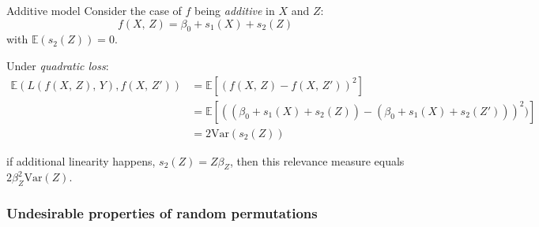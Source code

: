 \begin{example}{Additive model}{}
	Consider the case of $f$ being \emph{additive} in $X$ and $Z$:
	\begin{equation*}
		f(X,\,Z) = \beta_0 + s_1(X) + s_2(Z)
	\end{equation*}
	with $\mathds{E}(s_2(Z)) = 0$.

	Under \emph{quadratic loss}:
	\begin{align*}
		\mathds{E}(L(f(X,\,Z),\,Y),f(X,\,Z')) & = \mathds{E} \left[ (f(X,\,Z) - f(X,\,Z'))^2 \right] \\
		                                      & = \mathds{E} \left[
			\left(
			(\beta_0 + s_1(X) + s_2(Z)) - (\beta_0 + s_1(X) + s_2(Z'))
			\right)^2
			)
		\right]                                                                                      \\
		                                      & = 2\text{Var}(s_2(Z))
	\end{align*}

	if additional linearity happens, $s_2(Z) = Z\beta_Z$, then this relevance measure
	equals $2\beta_Z^2 \text{Var}(Z)$.
\end{example}

\subsubsection{Undesirable properties of random permutations}

